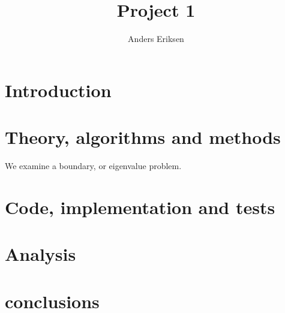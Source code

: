 \documentclass[10pt, twocolumn]{revtex4-1}
\begin{document}
\title{Project 1}
\author{Anders Eriksen}
\begin{abstract}

\end{abstract}
\maketitle

\section{Introduction}

\section{Theory, algorithms and methods}
We examine a boundary, or eigenvalue problem. 

\section{Code, implementation and tests}

\section{Analysis}


\section{conclusions}


\end{document}
